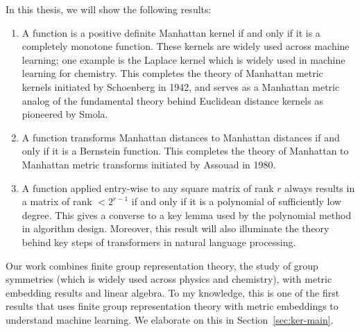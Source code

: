   In this thesis, we will show the following results:
\begin{enumerate}
    \item A function is a positive definite Manhattan kernel if and only
    if it is a completely monotone function. These kernels are widely
    used across machine learning; one example is the Laplace kernel
    which is widely used in machine learning for chemistry. This
    completes the theory of Manhattan metric kernels initiated by
    Schoenberg in 1942, and serves as a Manhattan metric analog of the
    fundamental theory behind Euclidean distance kernels as pioneered by
    Smola.
    \item A function transforms Manhattan distances to Manhattan distances if and only if it is a Bernstein function. This completes the theory of Manhattan to Manhattan metric transforms initiated by Assouad in 1980.
    \item A function applied entry-wise to any square matrix of rank $r$
    always results in a matrix of rank  $< 2^{r-1}$ if and only if it is
    a polynomial of sufficiently low degree. This gives a converse to a
    key lemma used by the polynomial method in algorithm design.
    Moreover, this result will also illuminate the theory behind key steps of
    transformers in natural language processing.
\end{enumerate} 

Our work combines finite group representation theory, the study of group
symmetries (which is widely used across physics and chemistry), with
metric embedding results and linear algebra. To my knowledge, this is
one of the first results that uses finite group representation theory
with metric embeddings to understand machine learning. We elaborate on
this in Section~\ref{sec:ker-main}.

